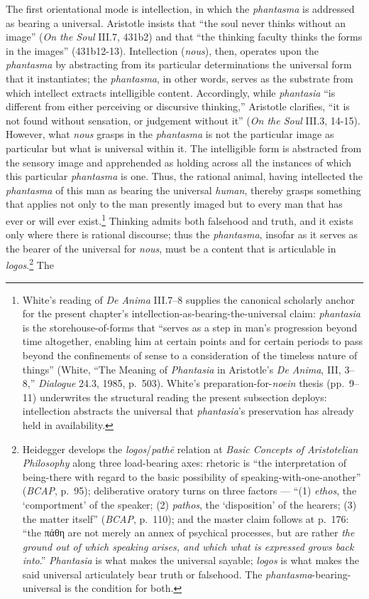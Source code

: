 \documentclass{article}
\newcommand{\gk}[1]{{\greekfont #1}}
\begin{document}
The first orientational mode is intellection, in which the \textit{phantasma} is addressed as bearing a universal. Aristotle insists that ``the soul never thinks without an image'' (\textit{On the Soul} III.7, 431b2) and that ``the thinking faculty thinks the forms in the images'' (431b12-13). Intellection (\textit{nous}), then, operates upon the \textit{phantasma} by abstracting from its particular determinations the universal form that it instantiates; the \textit{phantasma}, in other words, serves as the substrate from which intellect extracts intelligible content. Accordingly, while \textit{phantasia} ``is different from either perceiving or discursive thinking,'' Aristotle clarifies, ``it is not found without sensation, or judgement without it'' (\textit{On the Soul} III.3, 14-15). However, what \textit{nous} grasps in the \textit{phantasma} is not the particular image as particular but what is universal within it. The intelligible form is abstracted from the sensory image and apprehended as holding across all the instances of which this particular \textit{phantasma} is one. Thus, the rational animal, having intellected the \textit{phantasma} of this man as bearing the universal \textit{human}, thereby grasps something that applies not only to the man presently imaged but to every man that has ever or will ever exist.\footnote{White's reading of \textit{De Anima} III.7--8 supplies the canonical scholarly anchor for the present chapter's intellection-as-bearing-the-universal claim: \textit{phantasia} is the storehouse-of-forms that ``serves as a step in man's progression beyond time altogether, enabling him at certain points and for certain periods to pass beyond the confinements of sense to a consideration of the timeless nature of things'' (White, ``The Meaning of \textit{Phantasia} in Aristotle's \textit{De Anima}, III, 3--8,'' \textit{Dialogue} 24.3, 1985, p.~503). White's preparation-for-\textit{noein} thesis (pp.~9--11) underwrites the structural reading the present subsection deploys: intellection abstracts the universal that \textit{phantasia}'s preservation has already held in availability.} Thinking admits both falsehood and truth, and it exists only where there is rational discourse; thus the \textit{phantasma}, insofar as it serves as the bearer of the universal for \textit{nous}, must be a content that is articulable in \textit{logos}.\footnote{Heidegger develops the \textit{logos}/\textit{path\=e} relation at \textit{Basic Concepts of Aristotelian Philosophy} along three load-bearing axes: rhetoric is ``the interpretation of being-there with regard to the basic possibility of speaking-with-one-another'' (\textit{BCAP}, p.~95); deliberative oratory turns on three factors --- ``(1) \textit{ethos}, the `comportment' of the speaker; (2) \textit{pathos}, the `disposition' of the hearers; (3) the matter itself'' (\textit{BCAP}, p.~110); and the master claim follows at p.~176: ``the \gk{πάθη} are not merely an annex of psychical processes, but are rather \textit{the ground out of which speaking arises, and which what is expressed grows back into}.'' \textit{Phantasia} is what makes the universal sayable; \textit{logos} is what makes the said universal articulately bear truth or falsehood. The \textit{phantasma}-bearing-universal is the condition for both.} The 
\end{document}
